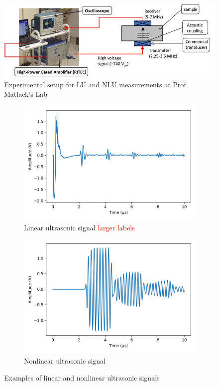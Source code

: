 \begin{figure}[tb]
  \centering
  \includegraphics[width=\linewidth]{fig/ultrasound setup.png}
  \caption{Experimental setup for LU and NLU measurements at Prof. Matlack's Lab}
  \label{fig: ultrasound setup}
\end{figure}

\begin{figure}[tb]
  \centering
  \begin{subfigure}[t]{0.49\linewidth}
    \includegraphics[width=\textwidth]{fig/lu_signal_raw.png}
    \caption{Linear ultrasonic signal \textcolor{red}{larger labels}}
    \label{fig: lu signal raw}
  \end{subfigure}
  \begin{subfigure}[t]{0.49\linewidth}
    \includegraphics[width=\textwidth]{fig/nlu_singal_raw.png}
    \caption{Nonlinear ultrasonic signal}
    \label{fig: nlu signal raw}
  \end{subfigure}

  \caption{Examples of linear and nonlinear ultrasonic signals}
  \label{fig: lu and nlu signals raw}
\end{figure}

